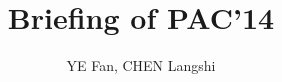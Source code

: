 \documentclass{report}
\begin{document}
\title{Briefing of PAC'14}
\author{YE Fan, CHEN Langshi}
\maketitle




\end{document}
